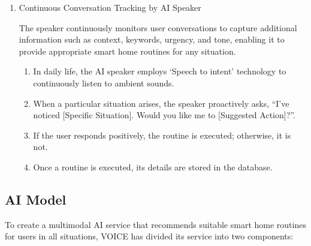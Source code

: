 \documentclass[conference]{IEEEtran}
\begin{document}
\begin{enumerate}[label=\arabic*]
    \vspace{1em}

    \item Continuous Conversation Tracking by AI Speaker\par
    \vspace{0.3em}
    The speaker continuously monitors user conversations to capture additional information such as context, keywords, urgency, and tone, enabling it to provide appropriate smart home routines for any situation.
    \vspace{0.3em}

    \begin{enumerate}[label=\arabic*)]
        \item In daily life, the AI speaker employs ‘Speech to intent’ technology to continuously listen to ambient sounds. 

        \vspace{0.5em}

        \item When a particular situation arises, the speaker proactively asks, “I've noticed [Specific Situation]. Would you like me to [Suggested Action]?”.

        \vspace{0.5em}

        \item If the user responds positively, the routine is executed; otherwise, it is not.

        \vspace{0.5em}

        \item Once a routine is executed, its details are stored in the database.
    \end{enumerate}
\end{enumerate}

\vspace{0.7em} %

\subsection{AI Model}
To create a multimodal AI service that recommends suitable smart home routines for users in all situations, VOICE has divided its service into two components:
\vspace{0.5em}
\end{document}
